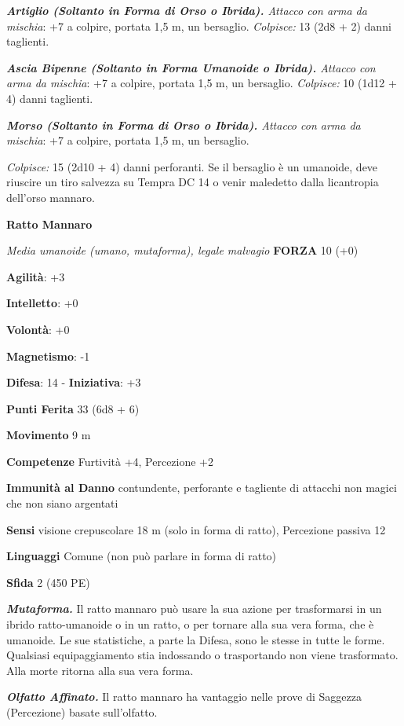 \begin{multicols}{2}
\emph{\textbf{Artiglio (Soltanto in Forma di Orso o Ibrida).} Attacco
con arma da mischia}: +7 a colpire, portata 1,5 m, un bersaglio.
\emph{Colpisce:} 13 (2d8 + 2) danni taglienti.

\emph{\textbf{Ascia Bipenne (Soltanto in Forma Umanoide o Ibrida).}
Attacco con arma da mischia}: +7 a colpire, portata 1,5 m, un bersaglio.
\emph{Colpisce:} 10 (1d12 + 4) danni taglienti.

\emph{\textbf{Morso (Soltanto in Forma di Orso o Ibrida).} Attacco con
arma da mischia}: +7 a colpire, portata 1,5 m, un bersaglio.

\emph{Colpisce:} 15 (2d10 + 4) danni perforanti. Se il bersaglio è un
umanoide, deve riuscire un tiro salvezza su Tempra DC 14 o venir
maledetto dalla licantropia dell'orso mannaro.

\textbf{Ratto Mannaro}

\emph{Media umanoide (umano, mutaforma), legale malvagio} \textbf{FORZA}
10 (+0)

\textbf{Agilità}: +3

\textbf{Intelletto}: +0

\textbf{Volontà}: +0

\textbf{Magnetismo}: -1

\textbf{Difesa}: 14 - \textbf{Iniziativa}: +3

\textbf{Punti Ferita} 33 (6d8 + 6)

\textbf{Movimento} 9 m

\textbf{Competenze} Furtività +4, Percezione +2

\textbf{Immunità al Danno} contundente, perforante e tagliente di
attacchi non magici che non siano argentati

\textbf{Sensi} visione crepuscolare 18 m (solo in forma di ratto), Percezione
passiva 12

\textbf{Linguaggi} Comune (non può parlare in forma di ratto)

\textbf{Sfida} 2 (450 PE)

\emph{\textbf{Mutaforma.}} Il ratto mannaro può usare la sua azione per
trasformarsi in un ibrido ratto-umanoide o in un ratto, o per tornare
alla sua vera forma, che è umanoide. Le sue statistiche, a parte la Difesa,
sono le stesse in tutte le forme. Qualsiasi equipaggiamento stia
indossando o trasportando non viene trasformato. Alla morte ritorna alla
sua vera forma.

\emph{\textbf{Olfatto Affinato.}} Il ratto mannaro ha vantaggio nelle
prove di Saggezza (Percezione) basate sull'olfatto.


\end{multicols}
